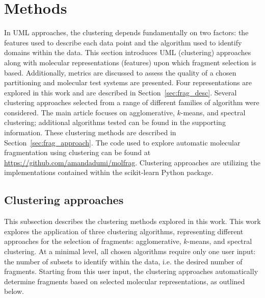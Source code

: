 \section{Methods}
In UML approaches, the clustering depends fundamentally on two factors: the features used to describe each data point and the algorithm used to identify domains within the data. 
This section introduces UML (clustering) approaches along with molecular representations (features) upon which fragment selection is based. 
Additionally, metrics are discussed to assess the quality of a chosen partitioning and molecular test systems are presented.
Four representations are explored in this work and are described in Section~\ref{sec:frag_desc}.
Several clustering approaches selected from a range of different families of algorithm were considered. 
The main article focuses on agglomerative, $k$-means, and spectral clustering; additional algorithms tested can be found in the supporting information.
These clustering methods are described in Section~\ref{sec:frag_approach}.
The code used to explore automatic molecular fragmentation using clustering can be found at \url{https://github.com/amandadumi/molfrag}. 
Clustering approaches are utilizing the implementations contained within the scikit-learn Python package.\autocite{scikit-learn}



\subsection{\label{sec:frag_approach} Clustering approaches}

This subsection describes the clustering methods explored in this work.
This work explores the application of three clustering algorithms, representing different approaches for the selection of fragments:  agglomerative, $k$-means, and spectral clustering.\autocite{10.1093/comjnl/16.1.30,10.1093/comjnl/20.4.364,1056489,zbMATH03129892,ng_spectral_2002}
At a minimal level, all chosen algorithms require only one user input: the number of subsets to identify within the data, i.e. the desired number of fragments. 
Starting from this user input, the clustering approaches automatically determine fragments based on selected molecular representations, as outlined below.
 

